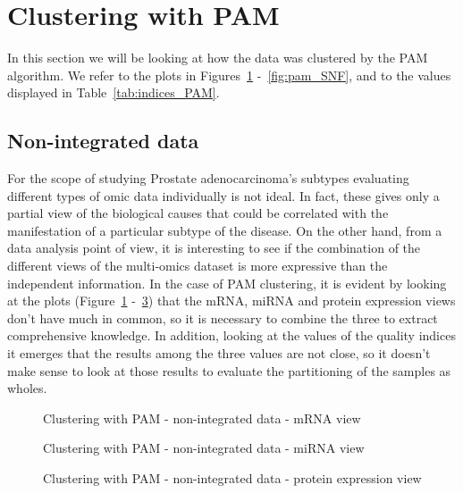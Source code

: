 \section{Clustering with PAM}\label{results_pam}
In this section we will be looking at how the data was clustered by the PAM algorithm. We refer to the plots in Figures~\ref{fig:pam_1} -~\ref{fig:pam_SNF}, and to the values displayed in Table~\ref{tab:indices_PAM}.
\subsection*{Non-integrated data}\label{pam_nonIntegrated}
For the scope of studying Prostate adenocarcinoma's subtypes evaluating different types of omic data individually is not ideal. In fact, these gives only a partial view of the biological causes that could be correlated with the manifestation of a particular subtype of the disease. On the other hand, from a data analysis point of view, it is interesting to see if the combination of the different views of the multi-omics dataset is more expressive than the independent information. In the case of PAM clustering, it is evident by looking at the plots (Figure~\ref{fig:pam_1} -~\ref{fig:pam_3}) that the mRNA, miRNA and protein expression views don't have much in common, so it is necessary to combine the three to extract comprehensive knowledge. In addition, looking at the values of the quality indices it emerges that the results among the three values are not close, so it doesn't make sense to look at those results to evaluate the partitioning of the samples as wholes.
\begin{figure}[!]
    \centering
    \caption{Clustering with PAM - non-integrated data - mRNA view}
    \label{fig:pam_1}
\end{figure}
\begin{figure}[!]
    \centering
    \caption{Clustering with PAM - non-integrated data - miRNA view}
    \label{fig:pam_2}
\end{figure}
\begin{figure}[!]
    \centering
    \caption{Clustering with PAM - non-integrated data - protein expression view}
    \label{fig:pam_3}
\end{figure}

